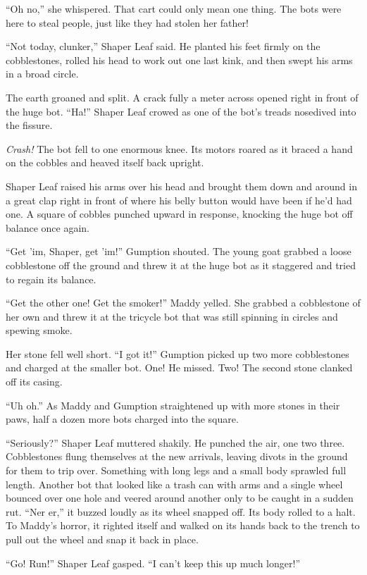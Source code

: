 \documentclass[10pt]{article}
\begin{document}
``Oh no,'' she whispered. That cart could only mean one thing. The bots
were here to steal people, just like they had stolen her father!

``Not today, clunker,'' Shaper Leaf said. He planted his feet firmly on
the cobblestones, rolled his head to work out one last kink, and then
swept his arms in a broad circle.

The earth groaned and split. A crack fully a meter across opened right
in front of the huge bot. ``Ha!'' Shaper Leaf crowed as one of the bot's
treads nosedived into the fissure.

\emph{Crash!} The bot fell to one enormous knee. Its motors roared as it
braced a hand on the cobbles and heaved itself back upright.

Shaper Leaf raised his arms over his head and brought them down and
around in a great clap right in front of where his belly button would
have been if he'd had one. A square of cobbles punched upward in
response, knocking the huge bot off balance once again.

``Get 'im, Shaper, get 'im!'' Gumption shouted. The young goat grabbed a
loose cobblestone off the ground and threw it at the huge bot as it
staggered and tried to regain its balance.

``Get the other one! Get the smoker!'' Maddy yelled. She grabbed a
cobblestone of her own and threw it at the tricycle bot that was still
spinning in circles and spewing smoke.

Her stone fell well short. ``I got it!'' Gumption picked up two more
cobblestones and charged at the smaller bot. One! He missed. Two! The
second stone clanked off its casing.

``Uh oh.'' As Maddy and Gumption straightened up with more stones in
their paws, half a dozen more bots charged into the square.

``Seriously?'' Shaper Leaf muttered shakily. He punched the air, one two
three. Cobblestones flung themselves at the new arrivals, leaving divots
in the ground for them to trip over. Something with long legs and a
small body sprawled full length. Another bot that looked like a trash
can with arms and a single wheel bounced over one hole and veered around
another only to be caught in a sudden rut. ``Ner er,'' it buzzed loudly
as its wheel snapped off. Its body rolled to a halt. To Maddy's horror,
it righted itself and walked on its hands back to the trench to pull out
the wheel and snap it back in place.

``Go! Run!'' Shaper Leaf gasped. ``I can't keep this up much longer!''
\end{document}
